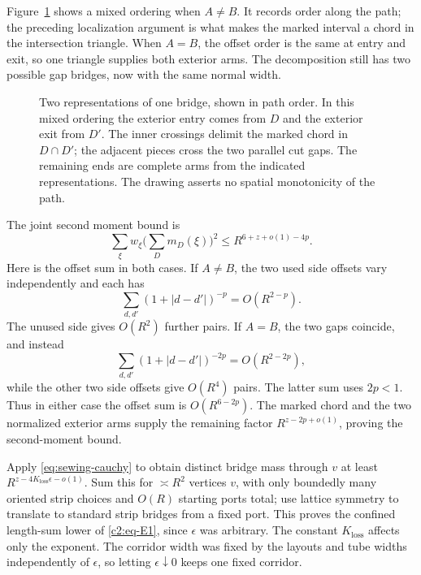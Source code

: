 Figure~\ref{fig:recoverable-cuts} shows a mixed ordering when \(A\ne B\).
It records order along the path; the preceding localization argument is
what makes the marked interval a chord in the intersection triangle.
When \(A=B\), the offset order is the same at entry and exit, so one
triangle supplies both exterior arms. The decomposition still has two
possible gap bridges, now with the same normal width.
\begin{figure}[htbp]
\centering

\caption{Two representations of one bridge, shown in path order. In this
mixed ordering the exterior entry comes from \(D\) and the exterior exit
from \(D'\). The inner crossings delimit the marked chord in
\(D\cap D'\); the adjacent pieces cross the two parallel cut gaps.
The remaining ends are complete arms from the indicated representations.
The drawing asserts no spatial monotonicity of the path.}
\label{fig:recoverable-cuts}
\end{figure}

The joint second moment bound is
\[
 \sum_\xi w_\xi\big(\sum_D m_D(\xi)\big)^2
 \le R^{6+z+o(1)-4p}.
\]
Here is the offset sum in both cases. If \(A\ne B\), the two used
side offsets vary independently and each has
\[
 \sum_{d,d'}(1+|d-d'|)^{-p}=O(R^{2-p}).
\]
The unused side gives \(O(R^2)\) further pairs. If \(A=B\), the two gaps
coincide, and instead
\[
 \sum_{d,d'}(1+|d-d'|)^{-2p}=O(R^{2-2p}),
\]
while the other two side offsets give \(O(R^4)\) pairs. The latter sum
uses \(2p<1\). Thus in either case the offset sum is \(O(R^{6-2p})\).
The marked chord and the two normalized exterior arms supply the remaining
factor \(R^{z-2p+o(1)}\), proving the second-moment bound.

Apply \eqref{eq:sewing-cauchy} to obtain distinct bridge mass through
\(v\) at least \(R^{z-4K_{\mathrm{loss}}\epsilon-o(1)}\). Sum this for \(\asymp R^2\) vertices \(v\), with only boundedly many oriented strip choices and \(O(R)\) starting ports total; use lattice symmetry to translate to standard strip bridges from a fixed port. This proves the confined length-sum lower of \eqref{c2:eq-E1}, since
$\epsilon$ was arbitrary.  The constant $K_{\mathrm{loss}}$ affects only the
exponent.  The corridor width was fixed by the layouts and tube widths
independently of $\epsilon$, so letting $\epsilon\downarrow0$ keeps one fixed
corridor.

